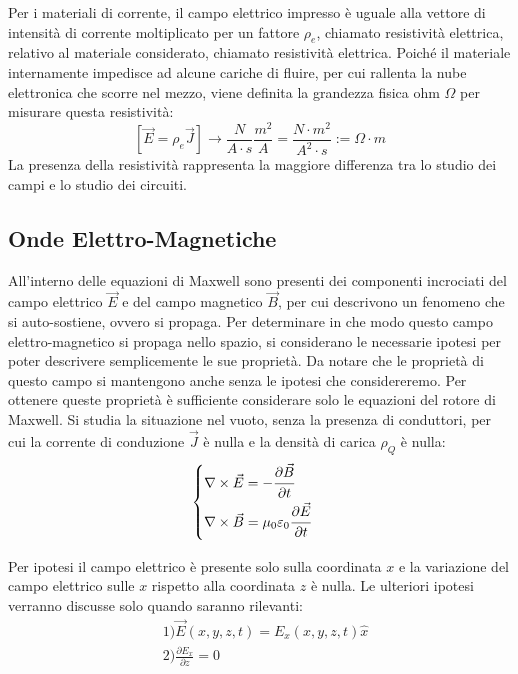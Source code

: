 \documentclass{article}
\numberwithin{equation}{subsection}
\begin{document}
Per i materiali di corrente, il campo elettrico impresso è uguale alla vettore di intensità di corrente moltiplicato per un fattore $\rho_e$, chiamato resistività elettrica, 
relativo al materiale considerato, chiamato resistività elettrica. Poiché il materiale internamente impedisce ad alcune cariche di fluire, per cui rallenta la nube elettronica 
che scorre nel mezzo, viene definita la grandezza fisica ohm $\Omega$ per misurare questa resistività:
\begin{equation*}
    \displaystyle\left[\vec{E}=\rho_{e}\vec{J}\right]\to\frac{N}{A\cdot s}\frac{m^2}{A}=\frac{N\cdot m^2}{A^2\cdot s}:=\Omega\cdot m
\end{equation*}
La presenza della resistività rappresenta la maggiore differenza tra lo studio dei campi e lo studio dei circuiti.  

\subsection{Onde Elettro-Magnetiche}
All'interno delle equazioni di Maxwell sono presenti dei componenti incrociati del campo elettrico $\vec{E}$ e del campo magnetico $\vec{B}$, per cui descrivono un fenomeno 
che si auto-sostiene, ovvero si propaga. Per determinare in che modo questo campo elettro-magnetico si propaga nello spazio, si considerano le necessarie ipotesi per poter 
descrivere semplicemente le sue proprietà. Da notare che le proprietà di questo campo si mantengono anche senza le ipotesi che considereremo. Per ottenere queste proprietà 
è sufficiente considerare solo le equazioni del rotore di Maxwell. Si studia la situazione nel vuoto, senza la presenza di conduttori, per cui la corrente di conduzione $\vec{J}$ 
è nulla e la densità di carica $\rho_Q$ è nulla: 
\begin{equation*}
    \begin{cases}
        \nabla\times\vec{E}=-\displaystyle\frac{\strut \partial \vec{B}}{\strut \partial t}\\
        \nabla\times\vec{B}=\mu_0\varepsilon_0\displaystyle\frac{\strut \partial \vec{E}}{\strut \partial t}
    \end{cases}
\end{equation*}

Per ipotesi il campo elettrico è presente solo sulla coordinata $x$ e la variazione del campo elettrico sulle $x$ rispetto alla coordinata $z$ è nulla. Le ulteriori ipotesi 
verranno discusse solo quando saranno rilevanti:
\begin{align*}
    &1)\vec{E}(x,y,z,t)=E_x(x,y,z,t)\hat{x}\\
    &2)\displaystyle\frac{\partial E_x}{\partial z}=0
\end{align*}
\end{document}
